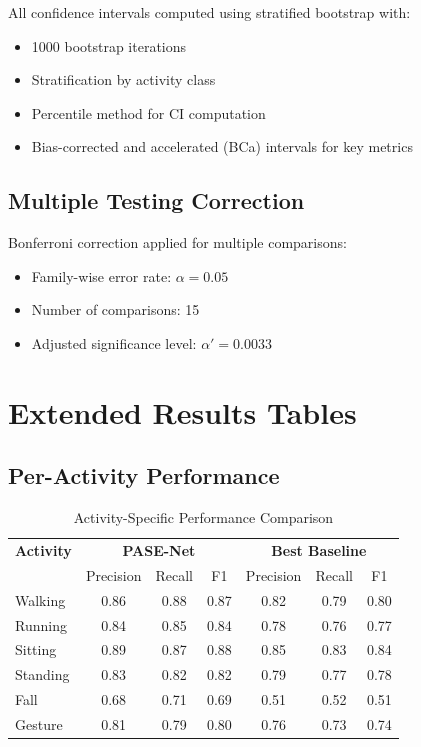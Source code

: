 \documentclass[10pt,a4paper]{article}
\begin{document}
All confidence intervals computed using stratified bootstrap with:
\begin{itemize}
\item 1000 bootstrap iterations
\item Stratification by activity class
\item Percentile method for CI computation
\item Bias-corrected and accelerated (BCa) intervals for key metrics
\end{itemize}

\subsection{Multiple Testing Correction}

Bonferroni correction applied for multiple comparisons:
\begin{itemize}
\item Family-wise error rate: $\alpha = 0.05$
\item Number of comparisons: 15
\item Adjusted significance level: $\alpha' = 0.0033$
\end{itemize}

\section{Extended Results Tables}

\subsection{Per-Activity Performance}

\begin{table}[h!]
\centering
\caption{Activity-Specific Performance Comparison}
\begin{tabular}{lcccccc}
\toprule
\textbf{Activity} & \multicolumn{3}{c}{\textbf{PASE-Net}} & \multicolumn{3}{c}{\textbf{Best Baseline}} \\
& Precision & Recall & F1 & Precision & Recall & F1 \\
\midrule
Walking & 0.86 & 0.88 & 0.87 & 0.82 & 0.79 & 0.80 \\
Running & 0.84 & 0.85 & 0.84 & 0.78 & 0.76 & 0.77 \\
Sitting & 0.89 & 0.87 & 0.88 & 0.85 & 0.83 & 0.84 \\
Standing & 0.83 & 0.82 & 0.82 & 0.79 & 0.77 & 0.78 \\
Fall & 0.68 & 0.71 & 0.69 & 0.51 & 0.52 & 0.51 \\
Gesture & 0.81 & 0.79 & 0.80 & 0.76 & 0.73 & 0.74 \\
\bottomrule
\end{tabular}
\end{table}
\end{document}
